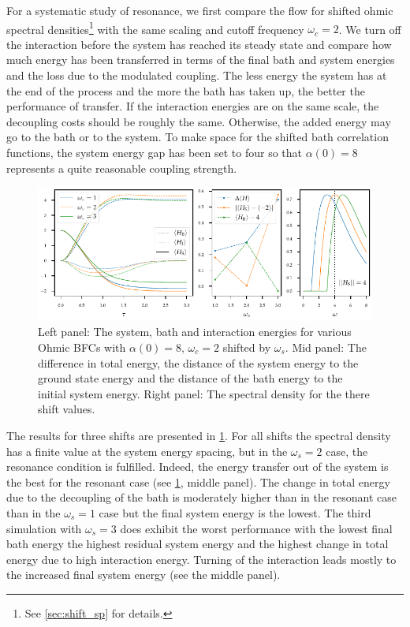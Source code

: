 For a systematic study of resonance, we first compare the flow for
shifted ohmic spectral densities\footnote{See \cref{sec:shift_sp} for
  details.} with the same scaling and cutoff frequency \(ω_c=2\). We
turn off the interaction before the system has reached its steady
state and compare how much energy has been transferred in terms of the
final bath and system energies and the loss due to the modulated
coupling. The less energy the system has at the end of the process and
the more the bath has taken up, the better the performance of
transfer. If the interaction energies are on the same scale, the
decoupling costs should be roughly the same. Otherwise, the added
energy may go to the bath or to the system.  To make space for the
shifted bath correlation functions, the system energy gap has been set
to four so that \(α(0)=8\) represents a quite reasonable coupling
strength.

\begin{figure}[h]
  \centering
  \includegraphics{figs/one_bath_syst/resonance_analysis}
  \caption{\label{fig:resonance_analysis} Left
    panel: The system, bath and interaction energies for various Ohmic
    BFCs with \(α(0)=8,\,ω_c=2\) shifted by \(ω_s\). Mid panel: The
    difference in total energy, the distance of the system energy to
    the ground state energy and the distance of the bath energy to the
    initial system energy. Right panel: The spectral density for the
    there shift values.}
\end{figure}
The results for three shifts are presented in
\cref{fig:resonance_analysis}. For all shifts the spectral density has
a finite value at the system energy spacing, but in the \(ω_s=2\)
case, the resonance condition is fulfilled. Indeed, the energy
transfer out of the system is the best for the resonant case (see
\cref{fig:resonance_analysis}, middle panel). The change in total
energy due to the decoupling of the bath is moderately higher than in
the resonant case than in the \(ω_s=1\) case but the final system
energy is the lowest. The third simulation with \(ω_s=3\) does exhibit
the worst performance with the lowest final bath energy the highest
residual system energy and the highest change in total energy due to
high interaction energy. Turning of the interaction leads mostly to
the increased final system energy (see the middle panel).

